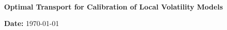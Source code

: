 \documentclass[11pt,a4paper]{article}
\begin{document}
\begin{titlepage}
    \centering 
    \vspace{8cm}
    
    {\Huge \bfseries {}} \\
    \vspace{0.5cm}

    \noindent\upcColor{\rule{\textwidth}{1pt}}
    
    {\LARGE \textbf{Optimal Transport for Calibration of Local Volatility Models}}
    
    \noindent\upcColor{\rule{\textwidth}{1pt}}

    \vfill

    \large
    \textbf{Date:} \today
\end{titlepage}

\clearpage
\tableofcontents
\clearpage

\clearpage


\clearpage
\thispagestyle{empty}
\null
\end{document}
